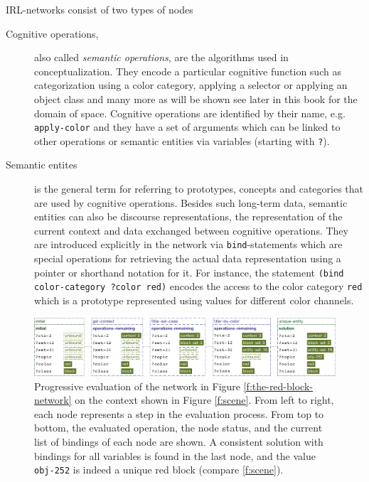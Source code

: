 IRL-networks consist of two types of nodes 
\begin{description}
\item[Cognitive operations,] also called \emph{semantic operations},
are the algorithms used in conceptualization. They encode a particular cognitive 
function such as categorization using a color category,
applying a selector or applying an object class and many more as will be shown
see later in this book for the domain of space. Cognitive operations 
are identified by their name, e.g. {\footnotesize\tt apply-color} and
they have a set of arguments which can be linked to other operations
or semantic entities via variables (starting with {\footnotesize\tt ?}).
\item[Semantic entites] is the general term for referring to prototypes,
concepts and categories that are used by cognitive operations.
Besides such long-term data, semantic entities can also be
discourse representations, the representation of the current context
and data exchanged between cognitive operations. They
are introduced explicitly in the network via {\footnotesize\tt bind}-statements
which are special operations for retrieving the actual data representation
using a pointer or shorthand notation for it. For instance, 
the statement {\footnotesize\tt (bind color-category ?color red)}
encodes the access to the color category {\footnotesize\tt red} which
is a prototype represented using values for different color channels.
\end{description}


\begin{figure}
\center
\includegraphics[width=1\columnwidth]{figs/evaluation-tree}
\caption[Evaluation of an IRL-network]{Progressive evaluation 
of the network in Figure \ref{f:the-red-block-network}
on the context shown in Figure \ref{f:scene}.
From left to right, each node represents a step in the evaluation process. From top to bottom, the evaluated operation, the node status, and the current list of bindings of each node are shown. A consistent solution with bindings for all variables is found in the last node, and the value 
{\footnotesize\tt obj-252} is indeed a unique red block (compare \ref{f:scene}).}
\label{f:evaluation-tree}
\end{figure}

